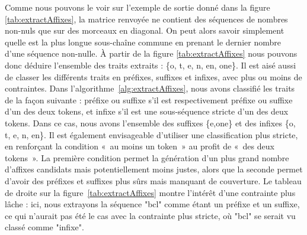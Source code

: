 \documentclass[PhD-Yoann-Dupont.tex]{subfiles}
\begin{document}
Comme nous pouvons le voir sur l'exemple de sortie donné dans la figure \ref{tab:extractAffixes}, la matrice renvoyée ne contient des séquences de nombres non-nuls que sur des morceaux en diagonal. On peut alors savoir simplement quelle est la plus longue sous-chaîne commune en prenant le dernier nombre d'une séquence non-nulle. À partir de la figure \ref{tab:extractAffixes} nous pouvons donc déduire l'ensemble des traits extraits : \{o, t, e, n, en, one\}. Il est aisé aussi de classer les différents traits en préfixes, suffixes et infixes, avec plus ou moins de contraintes. Dans l'algorithme\ \ref{alg:extractAffixes}, nous avons classifié les traits de la façon suivante : préfixe ou suffixe s'il est respectivement préfixe ou suffixe d'un des deux tokens, et infixe s'il est une sous-séquence stricte d'un des deux tokens. Dans ce cas, nous avons l'ensemble des suffixes \{e,one\} et des infixes \{o, t, e, n, en\}. Il est également envisageable d'utiliser une classification plus stricte, en renforçant la condition «\ au moins un token\ » au profit de «\ des deux tokens\ ». La première condition permet la génération d'un plus grand nombre d'affixes candidats mais potentiellement moins justes, alors que la seconde permet d'avoir des préfixes et suffixes plus sûrs mais manquant de couverture. Le tableau de droite sur la figure\ \ref{tab:extractAffixes} montre l'intérêt d'une contrainte plus lâche : ici, nous extrayons la séquence "bcl" comme étant un préfixe et un suffixe, ce qui n'aurait pas été le cas avec la contrainte plus stricte, où "bcl" se serait vu classé comme "infixe".
\end{document}

